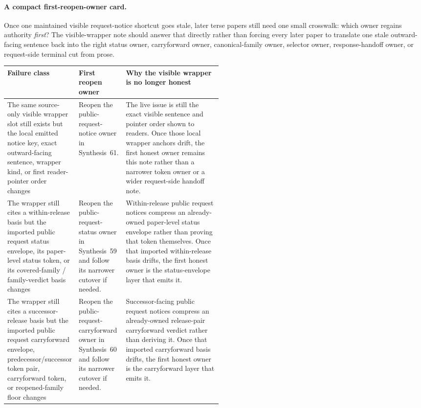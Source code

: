 \documentclass[11pt]{article}
\begin{document}
\paragraph{A compact first-reopen-owner card.}
Once one maintained visible request-notice shortcut goes stale, later terse papers still need one small crosswalk: which owner regains authority \emph{first}? The visible-wrapper note should answer that directly rather than forcing every later paper to translate one stale outward-facing sentence back into the right status owner, carryforward owner, canonical-family owner, selector owner, response-handoff owner, or request-side terminal cut from prose.

\begin{table}[t]
\centering
\small
\begin{tabularx}{\linewidth}{@{}p{0.29\linewidth}p{0.22\linewidth}X@{}}
\toprule
Failure class & First reopen owner & Why the visible wrapper is no longer honest \\
\midrule
The same source-only visible wrapper slot still exists but the local emitted notice key, exact outward-facing sentence, wrapper kind, or first reader-pointer order changes & Reopen the public-request-notice owner in Synthesis~61. & The live issue is still the exact visible sentence and pointer order shown to readers. Once those local wrapper anchors drift, the first honest owner remains this note rather than a narrower token owner or a wider request-side handoff note. \\
The wrapper still cites a within-release basis but the imported public request status envelope, its paper-level status token, or its covered-family / family-verdict basis changes & Reopen the public-request-status owner in Synthesis~59 and follow its narrower cutover if needed. & Within-release public request notices compress an already-owned paper-level status envelope rather than proving that token themselves. Once that imported within-release basis drifts, the first honest owner is the status-envelope layer that emits it. \\
The wrapper still cites a successor-release basis but the imported public request carryforward envelope, predecessor/successor token pair, carryforward token, or reopened-family floor changes & Reopen the public-request-carryforward owner in Synthesis~60 and follow its narrower cutover if needed. & Successor-facing public request notices compress an already-owned release-pair carryforward verdict rather than deriving it. Once that imported carryforward basis drifts, the first honest owner is the carryforward layer that emits it. \\

\end{tabularx}
\end{table}
\end{document}
